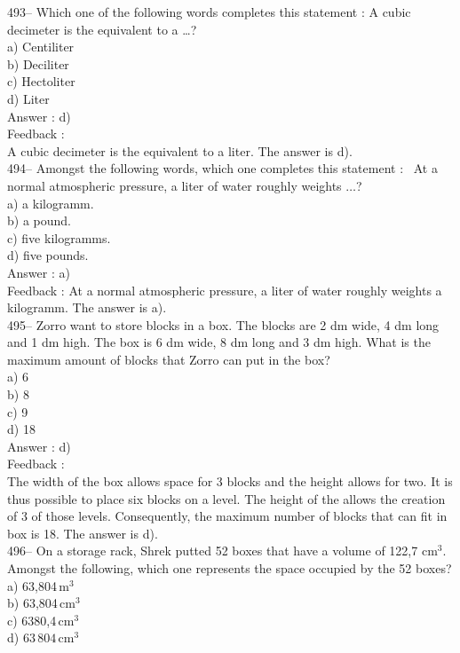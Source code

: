 \documentclass[letterpaper, 12pt]{article}
\begin{document}
493--  Which one of the following words completes this statement : \og A cubic decimeter is the equivalent to a \ldots\fg ?\\
a) Centiliter\\
b) Deciliter\\
c) Hectoliter\\
d) Liter\\

Answer : d)\\

Feedback : \\
A cubic decimeter is the equivalent to a liter.  The answer is d).\\

494-- Amongst the following words, which one completes this statement : \og\ At a normal atmospheric pressure, a liter of water roughly weights $\ldots$\fg ?\\
a) a kilogramm.\\
b) a pound.\\
c) five kilogramms.\\
d) five pounds.\\

Answer : a)\\

Feedback :
At a normal atmospheric pressure, a liter of water roughly weights a kilogramm.  The answer is a).\\

495-- Zorro want to store blocks in a box. The blocks are 2 dm wide, 4 dm long and 1 dm high. The box is 6 dm wide, 8 dm long and 3 dm high. What is the maximum amount of blocks that Zorro can put in the box?\\
a) 6\\
b) 8\\
c) 9\\
d) 18\\

Answer : d)\\

Feedback : \\
The width of the box allows space for 3 blocks and the height allows for two. It is thus possible to place six blocks on a level. The height of the allows the creation of 3 of those levels. Consequently, the maximum number of blocks that can fit in box is 18.  The answer is d).\\

496-- On a storage rack, Shrek putted 52 boxes that have a volume of 122,7 cm$^{3}$.  Amongst the following,
which one represents the space occupied by the 52 boxes? \\
a) 63,804\,m$^{3}$\\
b) 63,804\,cm$^{3}$\\
c) 6380,4\,cm$^{3}$\\
d) $63\,804$\,cm$^{3}$\\
\end{document}
